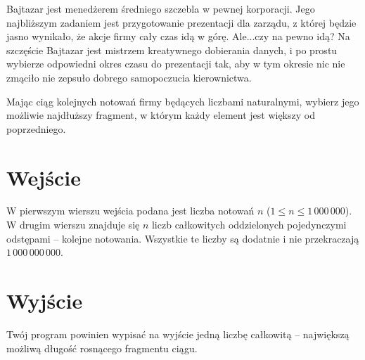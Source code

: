\documentclass{spiral-kurs}
\begin{document}
  \makeheader
  
      Bajtazar jest menedżerem średniego szczebla w pewnej korporacji. Jego najbliższym zadaniem jest przygotowanie prezentacji dla zarządu, z której będzie jasno wynikało, że akcje firmy cały czas idą w górę. Ale...czy na pewno idą? Na szczęście Bajtazar jest mistrzem kreatywnego dobierania danych, i po prostu wybierze odpowiedni okres czasu do prezentacji tak, aby w tym okresie nic nie zmąciło nie zepsuło dobrego samopoczucia kierownictwa.
      
      Mając ciąg kolejnych notowań firmy będących liczbami naturalnymi, wybierz jego możliwie najdłuższy fragment, w którym każdy element jest większy od poprzedniego.
      
      
  \section{Wejście}
      W pierwszym wierszu wejścia podana jest liczba notowań $n$ ($1 \leq n \leq 1\,000\,000$). W drugim wierszu znajduje się $n$ liczb całkowitych oddzielonych pojedynczymi odstępami -- kolejne notowania. Wszystkie te liczby są dodatnie i nie przekraczają $1\,000\,000\,000$.
      
      
  \section{Wyjście}
      Twój program powinien wypisać na wyjście jedną liczbę całkowitą -- największą możliwą długość rosnącego fragmentu ciągu.

  
\end{document}
